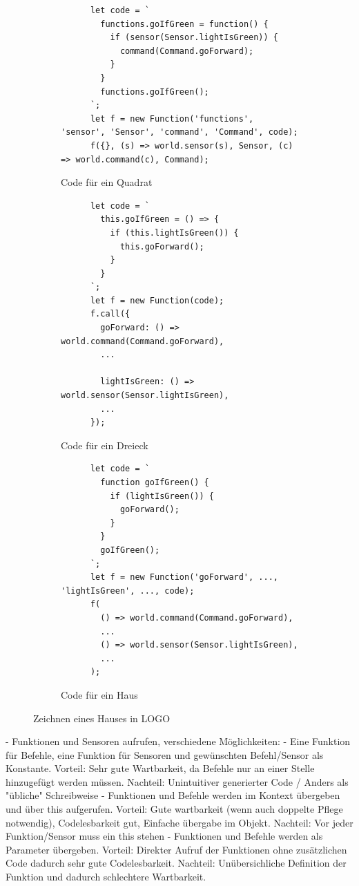 \begin{figure}
  \begin{subfigure}[b]{\textwidth}
    \begin{lstlisting}
      let code = `
        functions.goIfGreen = function() {
          if (sensor(Sensor.lightIsGreen)) {
            command(Command.goForward);
          }
        }
        functions.goIfGreen();
      `;
      let f = new Function('functions', 'sensor', 'Sensor', 'command', 'Command', code);
      f({}, (s) => world.sensor(s), Sensor, (c) => world.command(c), Command);
    \end{lstlisting}
    \caption{Code für ein Quadrat}
    \label{fig:implementation:code:func}
  \end{subfigure}
  \begin{subfigure}[b]{\textwidth}
    \begin{lstlisting}
      let code = `
        this.goIfGreen = () => {
          if (this.lightIsGreen()) {
            this.goForward();
          }
        }
      `;
      let f = new Function(code);
      f.call({
        goForward: () => world.command(Command.goForward),
        ...
        
        lightIsGreen: () => world.sensor(Sensor.lightIsGreen),
        ...
      });
    \end{lstlisting}
    \caption{Code für ein Dreieck}
    \label{fig:implementation:code:this}
  \end{subfigure}
  \begin{subfigure}[b]{\textwidth}
    \begin{lstlisting}
      let code = `
        function goIfGreen() {
          if (lightIsGreen()) {
            goForward();
          }
        }
        goIfGreen();
      `;
      let f = new Function('goForward', ..., 'lightIsGreen', ..., code);
      f(
        () => world.command(Command.goForward),
        ...
        () => world.sensor(Sensor.lightIsGreen),
        ...
      );
    \end{lstlisting}
    \caption{Code für ein Haus}
    \label{fig:implementation:code:param}
  \end{subfigure}
  \caption{Zeichnen eines Hauses in LOGO}
  \label{fig:implementation:code}
\end{figure}

- Funktionen und Sensoren aufrufen, verschiedene Möglichkeiten:
    - Eine Funktion für Befehle, eine Funktion für Sensoren und gewünschten Befehl/Sensor als Konstante. Vorteil: Sehr gute Wartbarkeit, da Befehle nur an einer Stelle hinzugefügt werden müssen. Nachteil: Unintuitiver generierter Code / Anders als "übliche" Schreibweise
    - Funktionen und Befehle werden im Kontext übergeben und über this aufgerufen. Vorteil: Gute wartbarkeit (wenn auch doppelte Pflege notwendig), Codelesbarkeit gut, Einfache übergabe im Objekt. Nachteil: Vor jeder Funktion/Sensor muss ein this stehen
    - Funktionen und Befehle werden als Parameter übergeben. Vorteil: Direkter Aufruf der Funktionen ohne zusätzlichen Code dadurch sehr gute Codelesbarkeit. Nachteil: Unübersichliche Definition der Funktion und dadurch schlechtere Wartbarkeit.

